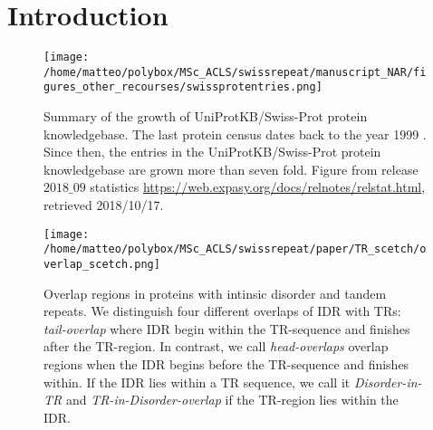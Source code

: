 \documentclass[a4,center,fleqn]{NAR}
\begin{document}
\section{Introduction}

%
%

\begin{figure*}[h]
\begin{center}
\texttt{[image: /home/matteo/polybox/MSc\_ACLS/swissrepeat/manuscript\_NAR/figures\_other\_recourses/swissprotentries.png]}
\end{center}
\caption{Summary of the growth of UniProtKB/Swiss-Prot protein knowledgebase. The last protein census dates back to the year 1999 \cite{Marcotte1999}. Since then, the entries in the UniProtKB/Swiss-Prot protein knowledgebase are grown more than seven fold. Figure from release $2018\_09$ statistics 	\url{https://web.expasy.org/docs/relnotes/relstat.html}, retrieved 2018/10/17.}
\label{sup:figSwissProtStats}
\end{figure*}

\begin{figure*}[t]
\begin{center}
\texttt{[image: /home/matteo/polybox/MSc\_ACLS/swissrepeat/paper/TR\_scetch/overlap\_scetch.png]}
\end{center}
\caption{Overlap regions in proteins with intinsic disorder and tandem repeats. We distinguish four different overlaps of IDR with TRs: \textit{tail-overlap} where IDR begin within the TR-sequence and finishes after the TR-region. In contrast, we call \textit{head-overlaps} overlap regions when the IDR begins before the TR-sequence and finishes within. If the IDR lies within a TR sequence, we call it \textit{Disorder-in-TR} and \textit{TR-in-Disorder-overlap} if the TR-region lies within the IDR.}
\label{sup:overlap_scetch}
\end{figure*}

\clearpage
\newpage
\end{document}
